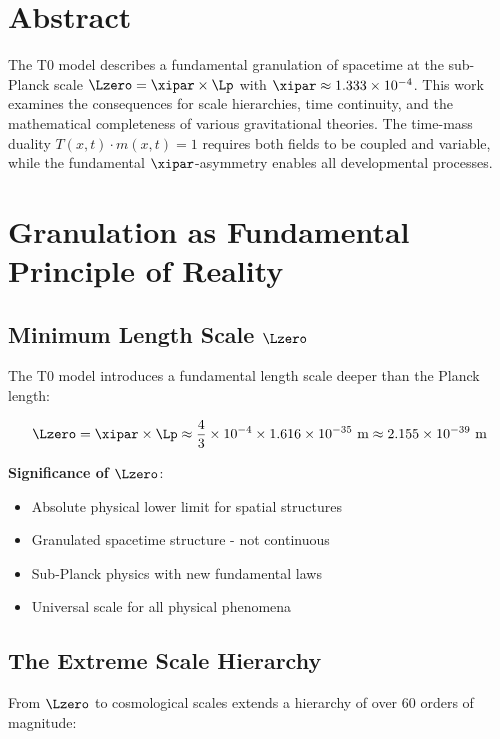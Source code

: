 \section*{Abstract}
		The T0 model describes a fundamental granulation of spacetime at the sub-Planck scale $\Lzero = \xipar \times \Lp$ with $\xipar \approx 1.333 \times 10^{-4}$. This work examines the consequences for scale hierarchies, time continuity, and the mathematical completeness of various gravitational theories. The time-mass duality $T(x,t) \cdot m(x,t) = 1$ requires both fields to be coupled and variable, while the fundamental $\xipar$-asymmetry enables all developmental processes.

	

	\section{Granulation as Fundamental Principle of Reality}
	
	\subsection{Minimum Length Scale $\Lzero$}
	
	The T0 model introduces a fundamental length scale deeper than the Planck length:
	
	\begin{equation}
		\Lzero = \xipar \times \Lp \approx \frac{4}{3} \times 10^{-4} \times 1.616 \times 10^{-35} \text{ m} \approx 2.155 \times 10^{-39} \text{ m}
	\end{equation}
	
	\textbf{Significance of $\Lzero$}:
	\begin{itemize}
		\item Absolute physical lower limit for spatial structures
		\item Granulated spacetime structure - not continuous
		\item Sub-Planck physics with new fundamental laws
		\item Universal scale for all physical phenomena
	\end{itemize}
	
	\subsection{The Extreme Scale Hierarchy}
	
	From $\Lzero$ to cosmological scales extends a hierarchy of over 60 orders of magnitude:
	
